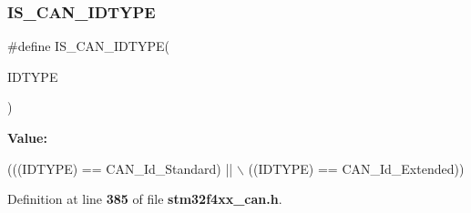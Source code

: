 \mbox{\label{group__CAN__identifier__type_gab845f7fbcf6ff8cf3d025210eb8900e4}} 
\subsubsection{I\+S\+\_\+\+C\+A\+N\+\_\+\+I\+D\+T\+Y\+PE}
{\footnotesize\ttfamily \#define I\+S\+\_\+\+C\+A\+N\+\_\+\+I\+D\+T\+Y\+PE(\begin{DoxyParamCaption}\item[{}]{I\+D\+T\+Y\+PE }\end{DoxyParamCaption})}

{\bfseries Value\+:}
\begin{DoxyCode}
(((IDTYPE) == CAN_Id_Standard) || \(\backslash\)
                               ((IDTYPE) == CAN_Id_Extended))
\end{DoxyCode}


Definition at line \textbf{ 385} of file \textbf{ stm32f4xx\+\_\+can.\+h}.


